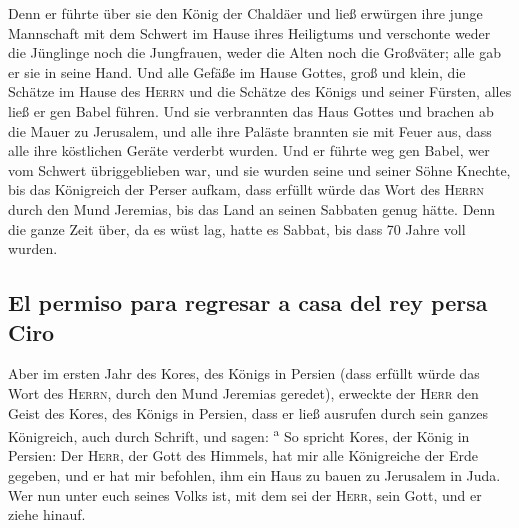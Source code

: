  Denn er führte über sie den König der Chaldäer und ließ
erwürgen ihre junge Mannschaft mit dem Schwert im Hause ihres Heiligtums
und verschonte weder die Jünglinge noch die Jungfrauen, weder die Alten
noch die Großväter; alle gab er sie in seine Hand.  Und
alle Gefäße im Hause Gottes, groß und klein, die Schätze im Hause des
\textsc{Herrn} und die Schätze des Königs und seiner Fürsten, alles ließ
er gen Babel führen.  Und sie verbrannten das Haus Gottes
und brachen ab die Mauer zu Jerusalem, und alle ihre Paläste brannten
sie mit Feuer aus, dass alle ihre köstlichen Geräte verderbt wurden.
 Und er führte weg gen Babel, wer vom Schwert
übriggeblieben war, und sie wurden seine und seiner Söhne Knechte, bis
das Königreich der Perser aufkam,  dass erfüllt würde das
Wort des \textsc{Herrn} durch den Mund Jeremias, bis das Land an seinen
Sabbaten genug hätte. Denn die ganze Zeit über, da es wüst lag, hatte es
Sabbat, bis dass 70 Jahre voll wurden.

\hypertarget{el-permiso-para-regresar-a-casa-del-rey-persa-ciro}{%
\subsection{El permiso para regresar a casa del rey persa
Ciro}\label{el-permiso-para-regresar-a-casa-del-rey-persa-ciro}}

 Aber im ersten Jahr des Kores, des Königs in Persien
(dass erfüllt würde das Wort des \textsc{Herrn}, durch den Mund Jeremias
geredet), erweckte der \textsc{Herr} den Geist des Kores, des Königs in
Persien, dass er ließ ausrufen durch sein ganzes Königreich, auch durch
Schrift, und sagen: \textsuperscript{a}  So spricht
Kores, der König in Persien: Der \textsc{Herr}, der Gott des Himmels,
hat mir alle Königreiche der Erde gegeben, und er hat mir befohlen, ihm
ein Haus zu bauen zu Jerusalem in Juda. Wer nun unter euch seines Volks
ist, mit dem sei der \textsc{Herr}, sein Gott, und er ziehe hinauf.

